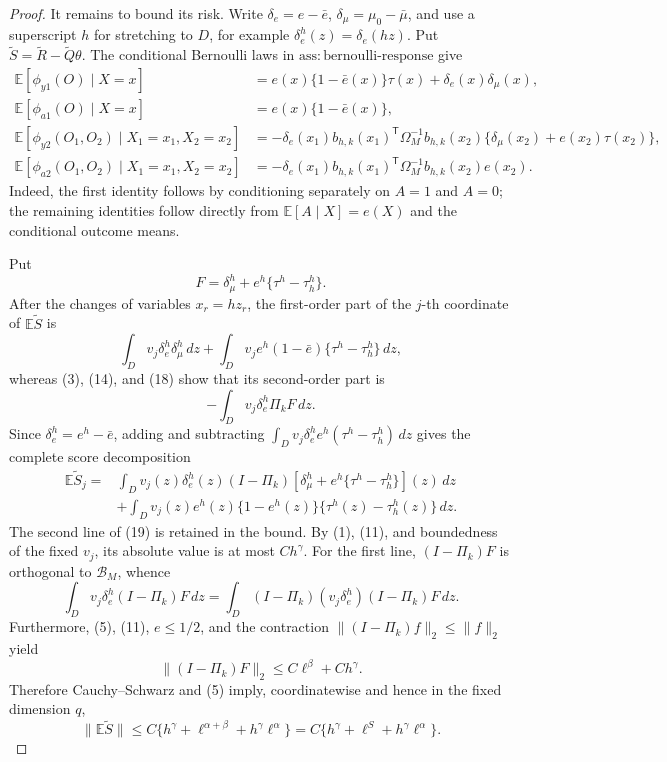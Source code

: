 \documentclass{article}
\begin{document}
\begin{proof}
It remains to bound its risk.  Write \(\delta_e=e-\bar e\), \(\delta_\mu=\mu_0-\bar\mu\), and use a superscript \(h\) for stretching to \(D\), for example \(\delta_e^h(z)=\delta_e(hz)\).  Put \(\widetilde S=\widetilde R-\widetilde Q\theta\).  The conditional Bernoulli laws in \(\mathrm{ass:bernoulli\mbox{-}response}\) give
\[
 \begin{split}
 \mathbb E[\phi_{y1}(O)\mid X=x]
 &=e(x)\{1-\bar e(x)\}\tau(x)+\delta_e(x)\delta_\mu(x),\\
 \mathbb E[\phi_{a1}(O)\mid X=x]
 &=e(x)\{1-\bar e(x)\},\\
 \mathbb E[\phi_{y2}(O_1,O_2)\mid X_1=x_1,X_2=x_2]
 &=-\delta_e(x_1)b_{h,k}(x_1)^{\mathsf T}\Omega_M^{-1}b_{h,k}(x_2)
 \{\delta_\mu(x_2)+e(x_2)\tau(x_2)\},\\
 \mathbb E[\phi_{a2}(O_1,O_2)\mid X_1=x_1,X_2=x_2]
 &=-\delta_e(x_1)b_{h,k}(x_1)^{\mathsf T}\Omega_M^{-1}b_{h,k}(x_2)e(x_2).
 \end{split}
 \tag{18}
\]
Indeed, the first identity follows by conditioning separately on \(A=1\) and \(A=0\); the remaining identities follow directly from \(\mathbb E[A\mid X]=e(X)\) and the conditional outcome means.

Put
\[
 F=\delta_\mu^h+e^h\{\tau^h-\tau_h^h\}.
\]
After the changes of variables \(x_r=hz_r\), the first-order part of the \(j\)-th coordinate of \(\mathbb E\widetilde S\) is
\[
 \int_D v_j\delta_e^h\delta_\mu^h\,dz
 +\int_D v_j e^h(1-\bar e)\{\tau^h-\tau_h^h\}\,dz,
\]
whereas (3), (14), and (18) show that its second-order part is
\[
 -\int_Dv_j\delta_e^h\Pi_kF\,dz.
\]
Since \(\delta_e^h=e^h-\bar e\), adding and subtracting \(\int_Dv_j\delta_e^he^h(\tau^h-\tau_h^h)\,dz\) gives the complete score decomposition
\[
 \begin{split}
 \mathbb E\widetilde S_j
 ={}&\int_Dv_j(z)\delta_e^h(z)(I-\Pi_k)
 \left[\delta_\mu^h+e^h\{\tau^h-\tau_h^h\}\right](z)\,dz\\
 &+\int_Dv_j(z)e^h(z)\{1-e^h(z)\}
 \{\tau^h(z)-\tau_h^h(z)\}\,dz.
 \end{split}
 \tag{19}
\]
The second line of (19) is retained in the bound.  By (1), (11), and boundedness of the fixed \(v_j\), its absolute value is at most \(Ch^\gamma\).  For the first line, \((I-\Pi_k)F\) is orthogonal to \(\mathcal B_M\), whence
\[
 \int_Dv_j\delta_e^h(I-\Pi_k)F\,dz
 =\int_D(I-\Pi_k)(v_j\delta_e^h)(I-\Pi_k)F\,dz.
\]
Furthermore, (5), (11), \(e\leq1/2\), and the contraction \(\|(I-\Pi_k)f\|_2\leq\|f\|_2\) yield
\[
 \|(I-\Pi_k)F\|_2
 \leq C\ell^\beta+Ch^\gamma.
\]
Therefore Cauchy--Schwarz and (5) imply, coordinatewise and hence in the fixed dimension \(q\),
\[
 \|\mathbb E\widetilde S\|
 \leq C\{h^\gamma+\ell^{\alpha+\beta}+h^\gamma\ell^\alpha\}
 =C\{h^\gamma+\ell^S+h^\gamma\ell^\alpha\}.
 \tag{20}
\]


\end{proof}
\end{document}
